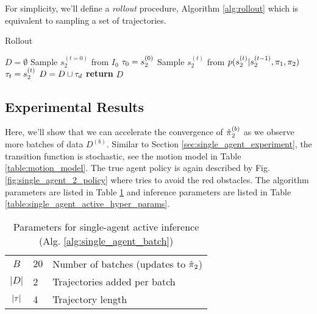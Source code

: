For simplicity, we'll define a \emph{rollout} procedure, Algorithm \ref{alg:rollout} which is equivalent to sampling a
set of trajectories.

        \begin{algorithm}
        \caption{Rollout}
        \label{alg:rollout}
        \begin{algorithmic}[1]
                \State $D=\emptyset$
                \State Sample $s_2^{(t=0)}$ from $I_0$
                \State $\tau_0 = s_2^{(0)}$
                \State Sample $s_2^{(t)}$ from $p(s_2^{(t)}|s_2^{(t-1)},\pi_{1}, \pi_{2})$
                \State $\tau_t = s_2^{(t)}$
                \EndFor
                \State $D = D\cup \tau_d$
                \EndFor
                \State \textbf{return} $D$
                \EndProcedure
        \end{algorithmic}
\end{algorithm}


\subsection{Experimental Results}

Here, we'll show that we can accelerate the convergence of $\hat{\pi_{}}_2^{(b)}$ as we observe more batches of
data $D^{(b)}$. Similar to Section \ref{sec:single_agent_experiment}, the transition function is stochastic, see the
motion model in Table \ref{table:motion_model}. The true agent policy is again described by Fig.
\ref{fig:single_agent_2_policy} where  tries to avoid the red obstacles. The algorithm parameters are listed in
Table \ref{table:single_agent_active_alg_params_short} and inference parameters are listed in Table
\ref{table:single_agent_active_hyper_params}.

    \begin{table}[htb]
        \centering
        \begin{tabular}{c|l l}
                $B$ & $20$ & Number of batches (updates to $\hat{\pi_{}}_2$)\\
                $|D|$ & 2 & Trajectories added per batch \\
                $|\tau|$ & 4 & Trajectory length \\
        \end{tabular}
        \caption{Parameters for single-agent active inference (Alg. \ref{alg:single_agent_batch})}
        \label{table:single_agent_active_alg_params_short}
\end{table}


